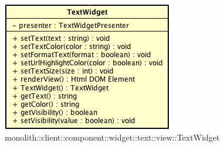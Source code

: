 \label{monolith::client::component::widget::text::view::TextWidget}
\begin{figure}[H]
	\centering
	\includegraphics[scale=0.5]{Sezioni/SottosezioniST/img/TextWidget.png}
	\caption{monolith::client::component::widget::text::view::TextWidget}
\end{figure}

